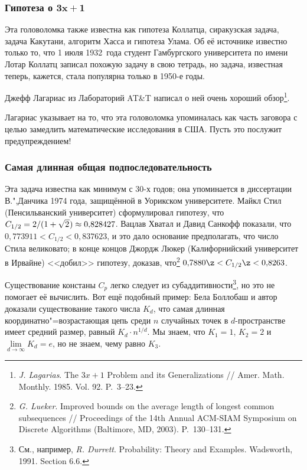 \documentclass[twoside]{book}
\begin{document}
\subsubsection*{Гипотеза о $\bm{3x+1}$}

Эта головоломка также известна как гипотеза Коллатца, сиракузская
задача, задача Какутани, алгоритм Хасса и гипотеза Улама.
Об её
источнике известно только то, что 1 июля 1932~года студент
Гамбургского университета по имени Лотар Коллатц записал похожую
задачу в свою тетрадь, но задача, известная теперь, кажется, стала
популярна только в 1950-е годы.

Джефф Лагариас из Лабораторий AT\&T написал о ней очень хороший
обзор\footnote{\emph{J. Lagarias}. The $3x+1$ Problem and its Generalizations /\!/ {Amer. Math. Monthly}. 1985. Vol. 92. P.~3--23.%
}.

Лагариас указывает на то, что эта головоломка упоминалась как часть
заговора с целью замедлить математические исследования в США.
Пусть
это послужит предупреждением!

\subsubsection*{Самая длинная общая подпоследовательность}

Эта задача известна как минимум с 30-х годов; она упоминается в
диссертации В.",Данчика 1974 года, защищённой в Уорикском
университете.
\mbox{Майкл} Стил (Пенсильванский университет)
сформулировал гипотезу, что $C_{1/2} = 2/(1+\sqrt{2\mkern1mu})\approx
0{,}828427$.
Вацлав Хватал и Давид Санкофф показали, что $0{,}773911
< C_{1/2} < 0{,}837623$, и это дало основание предполагать, что число
Стила великовато; в конце концов Джордж Люкер (Калифорнийский
университет в Ирвайне) <<добил>> гипотезу, доказав,
что\footnote{\emph{G. Lueker}.  Improved bounds on the average length of longest common subsequences /\!/ {Proceedings of the 14th Annual   ACM-SIAM Symposium on Discrete Algorithms} (Baltimore, MD, 2003). P.~130--131.}  $0{,}7880 \z< C_{1/2} \z< 0{,}8263$.

Существование констаны $C_p$ легко следует из
субаддитивности\footnote{См., например,
\emph{R. Durrett}. {Probability: Theory and Examples}. Wadsworth, 1991. Section 6.6.}, но это не помогает её вычислить.
Вот ещё
подобный пример: Бела Боллобаш и автор доказали существование такого
числа $K_d$, что самая длинная координатно"=возрастающая цепь среди
$n$ случайных точек в $d$-пространстве имеет средний размер, равный
$K_d\cdot n^{1/d}$.
Мы знаем, что $K_1=1$, $K_2=2$ и
$\lim\limits_{d\to\infty} K_d=e$, но не знаем, чему равно $K_3$.
\end{document}
